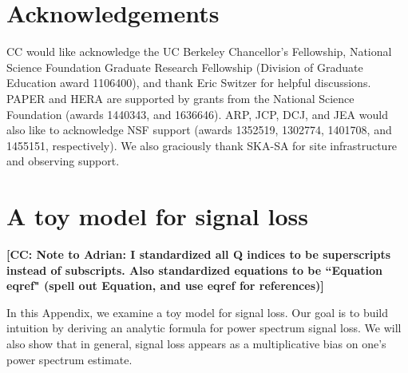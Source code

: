 \documentclass[preprint2,numberedappendix,tighten]{aastex6}  %
\newcommand{\cc}[1]{{\color{purple} \textbf{[CC: #1]}}}
\begin{document}
\section{Acknowledgements}
CC would like acknowledge the UC Berkeley Chancellor's Fellowship, National Science Foundation Graduate Research Fellowship (Division of Graduate Education award 1106400), and thank Eric Switzer for helpful discussions. PAPER and HERA are supported by grants from the National Science Foundation (awards 1440343, and 1636646). ARP, JCP, DCJ, and JEA would also like to acknowledge NSF support (awards 1352519, 1302774, 1401708, and 1455151, respectively). We also graciously thank SKA-SA for site infrastructure and observing support.
\label{sec:Ack}


\appendix
\section{A toy model for signal loss}
\label{sec:sigloss_appendix}

\cc{Note to Adrian: I standardized all Q indices to be superscripts instead of subscripts. Also standardized equations to be ``Equation eqref" (spell out Equation, and use eqref for references)}

In this Appendix, we examine a toy model for signal loss. Our goal is to build intuition by deriving an analytic formula for power spectrum signal loss. We will also show that in general, signal loss appears as a multiplicative bias on one's power spectrum estimate.
\end{document}
